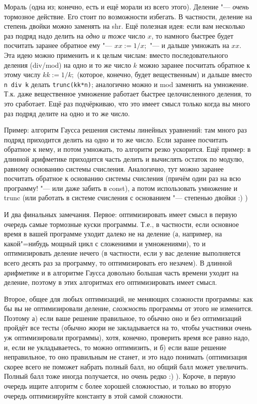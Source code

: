 Мораль (одна из; конечно, есть и ещё морали из всего этого). Деление "--- \textit{очень} тормозное 
действие. Его стоит по возможности избегать. В частности, деление на степень двойки можно заменять 
на shr. Ещё полезная идея: если вам несколько раз подряд надо делить на \textit{одно и тоже} число $x$, то 
намного быстрее будет посчитать заранее обратное ему "--- $xx:=1/x;$ "--- и дальше умножать на 
$xx$. Эта идею можно применить и к целым числам: вместо последовательного деления  
(div/mod) на одно и то же число $k$ можно заранее посчитать обратное к этому числу $kk:=1/k;$ (которое, конечно, 
будет вещественным) и дальше вместо \verb'n div k' делать \verb'trunc(kk*n)'; аналогично можно и 
mod заменить на умножение. Т.к. даже вещественное умножение работает быстрее целочисленного 
деления, то это сработает. Ещё раз подчёркиваю, что это имеет смысл только когда вы много раз 
подряд делите на одно и то же число.

Пример: алгоритм Гаусса решения системы линейных уравнений: там много раз подряд 
приходится делить на одно и то же число. Если заранее посчитать обратное к нему, и потом умножать, 
то алгоритм резко ускорится. Ещё пример: в длинной арифметике приходится часть делить и вычислять 
остаток по модулю, равному основанию системы счисления. Аналогично, тут можно заранее посчитать 
обратное к основанию системы счисления (причём один раз на всю программу! "--- или даже забить в 
const), а потом использовать умножение и trunc (или работать в системе счисления с 
основанием "--- степенью двойки :) )

И два финальных замечания. Первое: оптимизировать имеет смысл в первую очередь самые тормозные 
куски программы. Т.е., в частности, если основное время в вашей программе уходит далеко не на 
деление (а, например, на какой"=нибудь мощный цикл с сложениями и умножениями), то и оптимизировать 
деление нечего (в частности, если у вас деление выполняется всего десять раз за программу, то 
оптимизировать его незачем). В длинной арифметике и в алгоритме Гаусса довольно большая часть 
времени уходит на деление, поэтому в этих алгоритмах его оптимизировать имеет смысл.

Второе, общее для любых оптимизаций, не меняющих сложности программы: как бы вы не оптимизировали 
деление, \textit{сложность} программы от этого не изменится. Поэтому а) если ваше решение 
правильное, то обычно оно и без оптимизаций пройдёт все тесты (обычно жюри не закладывается на то, 
чтобы участники очень уж оптимизировали программы), хотя, конечно, проверить время все равно надо, 
и, если не укладываетесь, то можно оптимизить, и б) если ваше решение неправильное, то оно 
правильным не станет, и это надо понимать (оптимизация скорее всего не поможет набрать полный балл, 
но общий балл может увеличить. Полный балл тоже иногда получается, но очень редко :) ). Короче, в 
первую очередь ищите алгоритм с более хорошей сложностью, и только во вторую очередь оптимизируйте 
константу в этой самой сложности.
